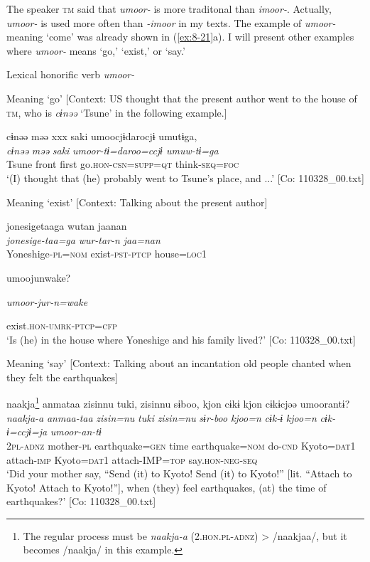 The speaker \textsc{tm} said that \textit{umoor-} is more traditonal than \textit{imoor-}. Actually, \textit{umoor-} is used more often than \textit{-imoor} in my texts. The example of \textit{umoor-} meaning ‘come’ was already shown in (\ref{ex:8-21}a). I will present other examples where \textit{umoor-} means ‘go,’ ‘exist,’ or ‘say.’

\ea\label{ex:8-22}
  Lexical honorific verb \textit{umoor-}

\ea Meaning ‘go’ [Context: US thought that the present author went to the house of \textsc{tm}, who is \textit{cɨnəə} ‘Tsune’ in the following example.]

   {\US}
\glll   cɨnəə  məə  xxx  saki  umoocjɨdarocjɨ  umutɨga,\\
\textit{cɨnəə}  \textit{məə}    \textit{saki}  \textit{umoor-tɨ=daroo=ccjɨ  umuw-tɨ=ga}\\
Tsune  front    first  go.\textsc{hon}-\textsc{csn}=\textsc{supp}=\textsc{qt}  think-\textsc{seq}=\textsc{foc}\\
\glt ‘(I) thought that (he) probably went to Tsune’s place, and ...’ [Co: 110328\_00.txt]

\ex Meaning ‘exist’ [Context: Talking about the present author]

   {\US}
\glll   jonesigetaaga  wutan  jaanan\\
\textit{jonesige-taa=ga}  \textit{wur-tar-n}  \textit{jaa=nan}  \\
Yoneshige-\textsc{pl}=\textsc{nom}  exist-\textsc{pst}-\textsc{ptcp}  house=\textsc{loc}1

      umoojunwake?

      \textit{umoor-jur-n=wake}

      exist.\textsc{hon}-\textsc{umrk}-\textsc{ptcp}=\textsc{cfp}\\
\glt ‘Is (he) in the house where Yoneshige and his family lived?’ [Co: 110328\_00.txt]

\ex Meaning ‘say’ [Context: Talking about an incantation old people chanted when they felt the earthquakes]

{\TM}
\glll  naakja\footnote{The regular process must be \textit{naakja-a} (2.\textsc{hon}.\textsc{pl}-\textsc{adnz}) > /naakjaa/, but it becomes /naakja/ in this example.}  anmataa  zisinnu  tuki,  zisinnu  sɨboo,{\footnotemark}  kjon  cɨkɨ  kjon  cɨkɨcjəə  umoorantɨ?\\
\textit{naakja-a}  \textit{anmaa-taa}  \textit{zisin=nu}  \textit{tuki}  \textit{zisin=nu}  \textit{sɨr-boo}      \textit{kjoo=n}  \textit{cɨk-ɨ}  \textit{kjoo=n}  \textit{cɨk-ɨ=ccjɨ=ja}  \textit{umoor-an-tɨ}\\
2\textsc{pl}-\textsc{adnz}  mother-\textsc{pl}  earthquake=\textsc{gen}  time  earthquake=\textsc{nom}  do-\textsc{cnd}    Kyoto=\textsc{dat1}  attach-\textsc{imp}  Kyoto=\textsc{dat1}  attach-IMP=\textsc{top}  say.\textsc{hon}-\textsc{neg}-\textsc{seq}\\
\glt ‘Did your mother say, “Send (it) to Kyoto! Send (it) to Kyoto!” [lit. “Attach to Kyoto! Attach to Kyoto!”], when (they) feel earthquakes, (at) the time of earthquakes?’ [Co: 110328\_00.txt]
\z
\z

